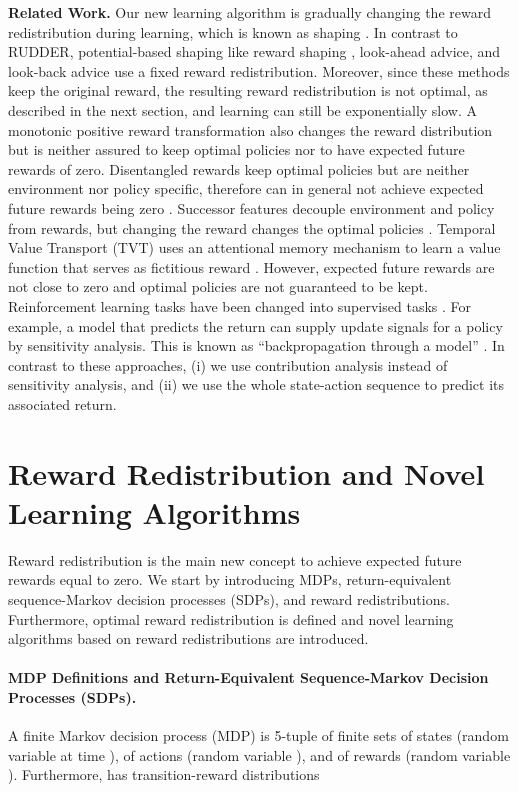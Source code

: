 \documentclass{article}
\begin{document}
{\bf Related Work.}
Our new learning algorithm is gradually changing 
the reward redistribution during learning, 
which is known as shaping \cite{Skinner:58,Sutton:18book}.
In contrast to RUDDER, potential-based shaping like 
reward shaping \cite{Ng:99}, look-ahead advice, and
look-back advice \cite{Wiewiora:03icml} use a fixed reward redistribution. 
Moreover, since these methods keep the original reward, 
the resulting reward redistribution is not optimal,
as described in the next section,
and learning can still be exponentially slow. 
A monotonic positive reward transformation \cite{Peters:07}
also changes the reward distribution but is neither assured 
to keep optimal policies nor to have expected future rewards of zero.
Disentangled rewards keep optimal policies but are neither environment 
nor policy specific, therefore can in general not achieve 
expected future rewards being zero \cite{Fu:18}.
Successor features decouple environment and policy 
from rewards, but changing the reward changes the  
optimal policies \cite{Barreto:17,Barreto:18}. 
Temporal Value Transport (TVT) uses 
an attentional memory mechanism to learn
a value function that serves as
fictitious reward \cite{Hung:18}. 
However, expected future rewards are not close to zero
and optimal policies are not guaranteed to be kept.
Reinforcement learning tasks have been changed
into supervised tasks \cite{Schaal:99,Barto:04,Schmidhuber:15}. 
For example, a model that predicts the return can supply update 
signals for a policy by sensitivity analysis. 
This is known as ``backpropagation through a model''  \cite{Munro:87,Robinson:89,RobinsonFallside:89,Werbos:90,Schmidhuber:91nips,Bakker:02,Bakker:07}.
In contrast to these approaches, 
(i) we use contribution analysis instead of 
sensitivity analysis,
and (ii) we use the whole state-action sequence to predict its
associated return.


\section{Reward Redistribution and Novel Learning Algorithms}


Reward redistribution is the main new concept
to achieve expected future rewards equal to zero.
We start by introducing MDPs,  
return-equivalent sequence-Markov decision processes (SDPs),
and reward redistributions.
Furthermore, optimal reward redistribution is defined and
novel learning algorithms based on reward redistributions 
are introduced.

\paragraph{MDP Definitions and 
           Return-Equivalent Sequence-Markov Decision Processes (SDPs).}
\label{c:def}
A finite Markov decision process (MDP) 
is 5-tuple  of finite sets
 of states  (random variable  at time ),
 of actions  (random variable ),
and  of rewards  (random variable ).
Furthermore,  has
transition-reward distributions
\end{document}
